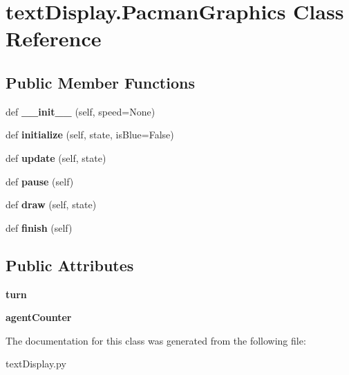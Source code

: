 \hypertarget{classtext_display_1_1_pacman_graphics}{}\section{text\+Display.\+Pacman\+Graphics Class Reference}
\label{classtext_display_1_1_pacman_graphics}
\subsection*{Public Member Functions}
\begin{DoxyCompactItemize}
\item 
\mbox{\label{classtext_display_1_1_pacman_graphics_a2a53cc3f0e6e5481e370429f7f714239}} 
def {\bfseries \+\_\+\+\_\+init\+\_\+\+\_\+} (self, speed=None)
\item 
\mbox{\label{classtext_display_1_1_pacman_graphics_ae4253aa0a95b7a17d7536781a78e4d2e}} 
def {\bfseries initialize} (self, state, is\+Blue=False)
\item 
\mbox{\label{classtext_display_1_1_pacman_graphics_a431f581ebd8d2cf60950edc516f4360b}} 
def {\bfseries update} (self, state)
\item 
\mbox{\label{classtext_display_1_1_pacman_graphics_ac0eb1250e27709f4efc2551743bfa042}} 
def {\bfseries pause} (self)
\item 
\mbox{\label{classtext_display_1_1_pacman_graphics_a2d230bfc90373966580443ce18bc7f01}} 
def {\bfseries draw} (self, state)
\item 
\mbox{\label{classtext_display_1_1_pacman_graphics_a3f5ce6c054c157205caf55f62c926619}} 
def {\bfseries finish} (self)
\end{DoxyCompactItemize}
\subsection*{Public Attributes}
\begin{DoxyCompactItemize}
\item 
\mbox{\label{classtext_display_1_1_pacman_graphics_ad590b9cef8434051027a2ef04346dad5}} 
{\bfseries turn}
\item 
\mbox{\label{classtext_display_1_1_pacman_graphics_af360ec76080002ef0e1c1b2f57b7cef4}} 
{\bfseries agent\+Counter}
\end{DoxyCompactItemize}


The documentation for this class was generated from the following file\+:\begin{DoxyCompactItemize}
\item 
text\+Display.\+py\end{DoxyCompactItemize}
